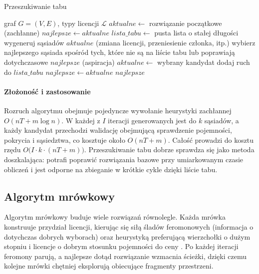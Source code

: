 \begin{algorithm}[H]
  \caption{Przeszukiwanie tabu}
  \label{alg:tabu}
  \begin{algorithmic}[1]
    \Require graf $G=(V,E)$, typy licencji $\mathcal{L}$
    \State $aktualne \gets$ rozwiązanie początkowe (zachłanne)
    \State $najlepsze \gets aktualne$
    \State $lista\_tabu \gets$ pusta lista o stałej długości
    \State wygeneruj sąsiadów $aktualne$ (zmiana licencji, przeniesienie członka, itp.)
    \State wybierz najlepszego sąsiada spośród tych, które nie są na liście tabu lub poprawiają dotychczasowe $najlepsze$ (aspiracja)
    \State $aktualne \gets$ wybrany kandydat
    \State dodaj ruch do $lista\_tabu$
    \State $najlepsze \gets aktualne$
    \EndIf
    \EndIf
    \EndFor
    \State \Return $najlepsze$
  \end{algorithmic}
\end{algorithm}

\paragraph{Złożoność i zastosowanie}
Rozruch algorytmu obejmuje pojedyncze wywołanie heurystyki zachłannej $O(nT + m\log n)$. W każdej z $I$ iteracji generowanych jest do $k$ sąsiadów, a każdy kandydat przechodzi walidację obejmującą sprawdzenie pojemności, pokrycia i sąsiedztwa, co kosztuje około $O(nT + m)$. Całość prowadzi do kosztu rzędu $O\bigl(I \cdot k \cdot (nT + m)\bigr)$. Przeszukiwanie tabu dobrze sprawdza się jako metoda doszkalająca: potrafi poprawić rozwiązania bazowe przy umiarkowanym czasie obliczeń i jest odporne na zbieganie w krótkie cykle dzięki liście tabu.


\subsection{Algorytm mrówkowy}\label{subsec:aco}
Algorytm mrówkowy buduje wiele rozwiązań równolegle. Każda mrówka konstruuje przydział licencji, kierując się siłą śladów feromonowych (informacja o dotychczas dobrych wyborach) oraz heurystyką preferującą wierzchołki o dużym stopniu i licencje o dobrym stosunku pojemności do ceny \cite{dorigo1997}. Po każdej iteracji feromony parują, a najlepsze dotąd rozwiązanie wzmacnia ścieżki, dzięki czemu kolejne mrówki chętniej eksplorują obiecujące fragmenty przestrzeni.

